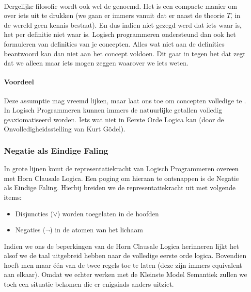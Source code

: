\paragraph{}Dergelijke filosofie wordt ook wel de  genoemd. Het is een compacte manier om  over iets uit te drukken (we gaan er immers vanuit dat er naast de theorie $T$, in de wereld geen kennis bestaat). En dus indien niet gezegd werd dat iets waar is, het per definitie niet waar is. Logisch programmeren ondersteund dan ook het formuleren van definities van je concepten. Alles wat niet aan de definities beantwoord kan dan niet aan het concept voldoen. Dit gaat in tegen het  dat zegt dat we alleen maar iets mogen zeggen waarover we iets weten.
\paragraph{Voordeel}Deze assumptie mag vreemd lijken, maar laat ons toe om concepten volledige te . In Logisch Programmeren kunnen immers de natuurlijke getallen volledig geaxiomatiseerd worden. Iets wat niet in Eerste Orde Logica kan (door de Onvolledigheidsstelling van Kurt G\"odel).
\subsubsection{Negatie als Eindige Faling}
In grote lijnen komt de representatiekracht van Logisch Programmeren overeen met Horn Clausale Logica. Een poging om hieraan te ontsnappen is de Negatie als Eindige Faling. Hierbij breiden we de representatiekracht uit met volgende items:
\begin{itemize}
 \item Disjuncties ($\vee$) worden toegelaten in de hoofden
 \item Negaties ($\neg$) in de atomen van het lichaam
\end{itemize}
Indien we ons de beperkingen van de Horn Clausale Logica herinneren lijkt het alsof we de taal uitgebreid hebben naar de volledige eerste orde logica. Bovendien hoeft men maar \'e\'en van de twee regels toe te laten (deze zijn immers equivalent aan elkaar). Omdat we echter werken met de Kleinste Model Semantiek zullen we toch een situatie bekomen die er enigsinds anders uitziet.
